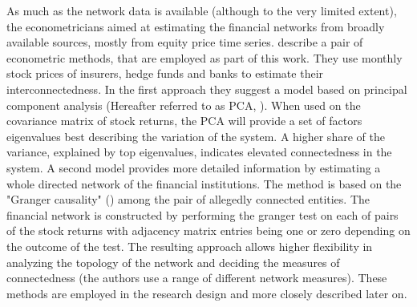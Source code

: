\documentclass[12pt]{article}
\begin{document}
As much as the network data is available (although to the very limited extent), the econometricians aimed at estimating the financial networks from broadly available sources, mostly from equity price time series. \cite{billio12} describe a pair of econometric methods, that are employed as part of this work. They use monthly stock prices of insurers, hedge funds and banks to estimate their interconnectedness. In the first approach they suggest a model based on principal component analysis (Hereafter referred to as PCA, \cite{murihead09}). When used on the covariance matrix of stock returns, the PCA will provide a set of factors eigenvalues best describing the variation of the system. A higher share of the variance, explained by top eigenvalues, indicates elevated connectedness in the system. A second model provides more detailed information by estimating a whole directed network of the financial institutions. The method is based on the "Granger causality" (\cite{granger69}) among the pair of allegedly connected entities. The financial network is constructed by performing the granger test on each of pairs of the stock returns with adjacency matrix entries being one or zero depending on the outcome of the test. The resulting approach allows higher flexibility in analyzing the topology of the network and deciding the measures of connectedness (the authors use a range of different network measures). These methods are employed in the research design and more closely described later on. 
\end{document}
